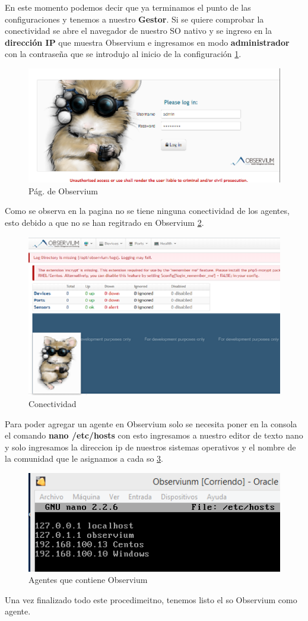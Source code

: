 En este momento podemos decir que ya terminamos el punto de las configuraciones y tenemos a nuestro \textbf{Gestor}.
Si  se quiere comprobar la  conectividad se abre el navegador de nuestro SO nativo y se ingreso en la \textbf{dirección IP} que muestra Observium e ingresamos en modo \textbf{administrador} con la contraseña que se  introdujo al inicio de la configuración \ref{image:observium}.

\FloatBarrier
\begin{figure}[htbp!]
		\centering
			\includegraphics[width=.5 \textwidth]{../images/3-Observium.png}
		\caption{Pág. de Observium}
		\label{image:observium}
\end{figure}
\FloatBarrier

Como se observa en la pagina no se tiene ninguna conectividad de los agentes, esto debido a que no se han regitrado en Observium \ref{image:pag}.

\FloatBarrier
\begin{figure}[htbp!]
		\centering
			\includegraphics[width=.7 \textwidth]{../images/4-Observium.png}
		\caption{Conectividad}
		\label{image:pag}
\end{figure}
\FloatBarrier

Para poder agregar un agente en Observium solo se necesita poner en la consola el comando \textbf{nano /etc/hosts} con esto ingresamos a nuestro editor de texto nano y solo ingresamos la direccion ip de nuestros sistemas operativos y el nombre de la comunidad que le asignamos a cada so \ref{image:agente}.

\FloatBarrier
\begin{figure}[htbp!]
		\centering
			\includegraphics[width=.5 \textwidth]{../images/5-Observium.png}
		\caption{Agentes que contiene Observium}
		\label{image:agente}
\end{figure}
\FloatBarrier

Una vez finalizado todo este procedimeitno, tenemos listo el so Observium como agente.



